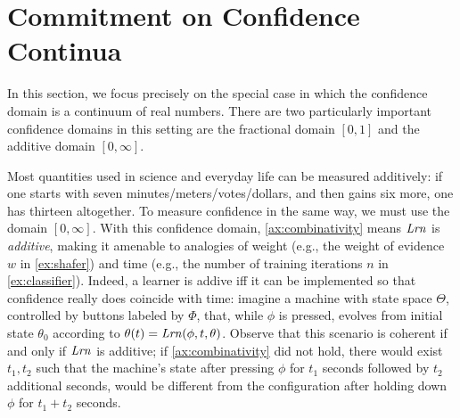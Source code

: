 
\section{Commitment on Confidence Continua}
In this section, we focus precisely on the special case in which the confidence domain is a continuum of real numbers. 
There are two particularly important confidence domains in this setting are the fractional domain $[0,1]$ and the additive domain $[0,\infty]$.


Most quantities 
used in science and everyday life
can be measured additively:
if one starts with seven minutes/meters/votes/dollars,
and then gains six
more,
one has thirteen altogether.
To measure confidence in the same way, we must use the domain $[0,\infty]$. 
With this confidence domain, \cref{ax:combinativity} means $\mathit{Lrn}$ is \emph{additive},
making it amenable to analogies of weight (e.g., the weight of evidence $w$ in \cref{ex:shafer})
and time (e.g., the number of training iterations $n$ in \cref{ex:classifier}).
Indeed, a learner is addive iff it can be implemented so that confidence really does coincide with time: imagine a machine with state space $\Theta$, controlled by buttons labeled by $\Phi$, that, while $\phi$ is pressed, evolves from initial state $\theta_0$ according to $\theta(t) = \mathit{Lrn}(\phi, t, \theta)$. 
Observe that this scenario is coherent if and only if $\mathit{Lrn}$ is additive; if \cref{ax:combinativity} did not hold, there would exist $t_1,t_2$ such that the machine's state after pressing $\phi$ for $t_1$ seconds followed by $t_2$ additional seconds, would be different from the configuration after holding down $\phi$ for $t_1+t_2$ seconds.


